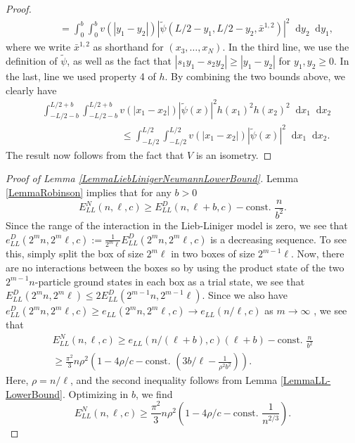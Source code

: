 \documentclass[a4paper,11pt]{article}
\newcommand{\abs}[1]{\left\lvert #1 \right\rvert}
\newcommand*\diff{\mathop{}\!\mathrm{d}}
\numberwithin{equation}{section}
\begin{document}
\begin{proof}
\begin{equation}
\begin{aligned}
		&\quad\quad=\int_{0}^{b}\int_{0}^{b}v(\abs{y_1-y_2})\abs{\tilde{\psi}(L/2-y_1,L/2- y_2,\bar{x}^{1,2})}^2\diff y_2\diff y_1,
		\end{aligned}
		\end{equation}
		where we write $\bar{x}^{1,2}$ as shorthand for $ (x_3,\dots, x_N)$.
		In the third line, we use the definition of $ \tilde{\psi} $, as well as the fact that $ \abs{s_1y_1-s_2y_2}\geq \abs{y_1-y_2} $ for $ y_1,y_2\geq 0 $. In the last, line we used property 4 of $ h $.
		By combining the two bounds above, we clearly have 
		\begin{equation}
		\begin{aligned}
		&\int_{-L/2-b}^{L/2+b}\int_{-L/2-b}^{L/2+b}v(\abs{x_1-x_2})\abs{\tilde{\psi}(x)}^2h(x_1)^2h(x_2)^2\diff x_1\diff x_2\\&\qquad\qquad\qquad\qquad \leq \int_{-L/2}^{L/2}\int_{-L/2}^{L/2}v(\abs{x_1-x_2})\abs{\tilde{\psi}(x)}^2\diff x_1\diff x_2.
		\end{aligned}
		\end{equation}
		 The result now follows from the fact that $ V $ is an isometry.
	\end{proof}
	\begin{proof}[Proof of Lemma \ref{LemmaLiebLinigerNeumannLowerBound}]
		Lemma \ref{LemmaRobinson} implies that for any $ b>0 $ \begin{equation}
		E_{LL}^{N}(n,\ell,c)\geq E_{LL}^D(n,\ell+b,c)-\text{const. }\frac{n}{b^2}.
		\end{equation}
		Since the range of the interaction in the Lieb-Liniger model is zero, we see that $ e^D_{LL}(2^mn,2^m\ell,c):=\frac{1}{2^m\ell}E_{LL}^{D}(2^mn,2^m\ell,c) $ is a decreasing sequence. To see this, simply split the box of size $ 2^m\ell $ in two boxes of size $ 2^{m-1}\ell $. Now, there are no interactions between the boxes so by using the product state of the two $ 2^{m-1}n $-particle ground states in each box as a trial state, we see that $ E^D_{LL}(2^{m}n,2^m\ell)\leq 2E^D_{LL}(2^{m-1}n,2^{m-1}\ell)  $. Since we also have $ e^D_{LL}(2^mn,2^m\ell,c)\geq e_{LL}(2^mn,2^m\ell,c)\to e_{LL}(n/\ell,c) $ as $ m\to\infty $ \cite{lieb1963exact}, we see that \begin{equation}
		\begin{aligned}
		E_{LL}^{N}(n,\ell,c)\geq e_{LL}(n/(\ell+b),c)(\ell+b)-\text{const. }\frac{n}{b^2}\\\geq \frac{\pi^2}{3}n\rho^2\left(1-4\rho/c-\text{const. }\left(3b/\ell-\frac{1}{\rho^2b^2}\right)\right).
		\end{aligned}
		\end{equation}
		Here, $ \rho=n/\ell $, and the second inequality follows from Lemma \ref{LemmaLL-LowerBound}. Optimizing in $ b $, we find \begin{equation}
		E_{LL}^{N}(n,\ell,c)\geq \frac{\pi^2}{3}n\rho^2\left(1-4\rho/c-\text{const. }\frac{1}{n^{2/3}}\right).
		\end{equation}
	\end{proof}
\end{document}
